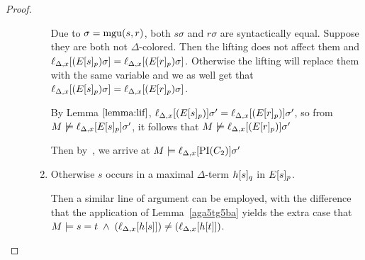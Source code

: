 \documentclass[,%
	paper=a4,%
	DIV14, 
	liststotoc,
	bibtotoc,
	draft=false,%
	numbers=noendperiod
]{scrartcl}
\newcommand{\lif}[1]{\lift{\Delta}{#1}{x}}
\begin{document}
\begin{proof}
\begin{description}
\begin{enumerate}
				Due to $\sigma=\operatorname{mgu}(s, r)$, both $s\sigma$ and $r\sigma$ are syntactically equal.
				Suppose they are both not $\Delta$-colored.
				Then the lifting does not affect them and 
				$\lif{(E\occurat{s}{p})\sigma} = \lif{(E\occurat{r}{p})\sigma}$.
				Otherwise the lifting will replace them with the same variable and we as well get that
				$\lif{(E\occurat{s}{p})\sigma} = \lif{(E\occurat{r}{p})\sigma}$.

				By Lemma $\ref{lemma:lif}$, 
				$\lif{(E\occurat{s}{p})}\sigma' = \lif{(E\occurat{r}{p})}\sigma'$,
				so from $M \notentails \lif{E\occurat{s}{p}}\sigma'$, it follows that $M \notentails \lif{(E\occurat{r}{p})}\sigma'$

				Then by~\markB{}, we arrive at $M\entails \lif{\PI(C_2)}\sigma'$






			\item Otherwise $s$ occurs in a maximal $\Delta$-term $h{[s]_{q}}$ in $E{[s]_{p}}$.

				Then a similar line of argument can be employed, with the difference that the application of Lemma~\ref{aga5tg5ba} yields the extra case that 
			$M\entails s=t \;\land\;(\lif{h\occur{s}}) \neq (\lif{h\occur{t}})$.
				\begin{comment}
				\newenvironment{lemmaCustomNo}[1]
				{\renewcommand{\thelemma}{\ref{#1}$'$}%
					\addtocounter{lemma}{-1}%
				\begin{lemma}}
				{\end{lemma}}


				Then we have to replace Lemma \ref{aga5tg5ba} by:
				\bigskip

				\begin{lemmaCustomNo}{aga5tg5ba}
					$M \entails (\lif{s}) = (\lif{t})$ and $M\notentails \lif{E\occurat{t}{p}}\sigma'$ imply that $M\notentails \lif{E\occurat{s}{p}}\sigma'$ or that $\lif{h\occurat{s}{q}} \neq \lif{h\occurat{t}{q}}$.
				\end{lemmaCustomNo}
				\begin{proof}
					If $\lif{E\occurat{t}{p}}$ and $\lif{E\occurat{s}{p}}$ differ only at position $p$, then the proof of Lemma \ref{aga5tg5ba} applies.
					

\end{comment}
\end{enumerate}
\end{description}
\end{proof}
\end{document}
